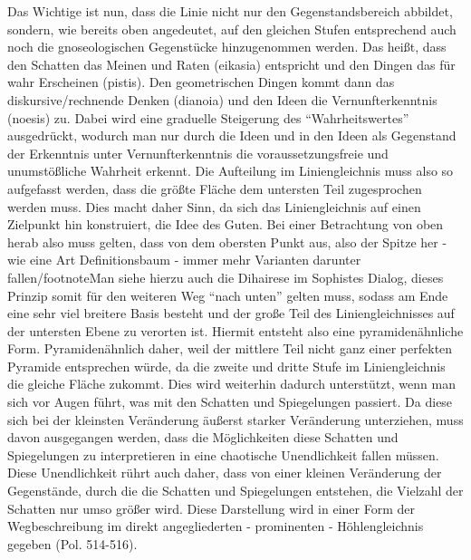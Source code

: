 Das Wichtige ist nun, dass die Linie nicht nur den Gegenstandsbereich abbildet, sondern, wie bereits oben angedeutet, auf den gleichen Stufen entsprechend auch noch die gnoseologischen Gegenstücke hinzugenommen werden. Das heißt, dass den Schatten das Meinen und Raten (eikasia) entspricht und den Dingen das für wahr Erscheinen (pistis). Den geometrischen Dingen kommt dann das diskursive/rechnende Denken (dianoia) und den Ideen die Vernunfterkenntnis (noesis) zu. Dabei wird eine graduelle Steigerung des \enquote{Wahrheitswertes} ausgedrückt, wodurch man nur durch die Ideen und in den Ideen als Gegenstand der Erkenntnis unter Vernunfterkenntnis die voraussetzungsfreie und unumstößliche Wahrheit erkennt. 
Die Aufteilung im Liniengleichnis muss also so aufgefasst werden, dass die größte Fläche dem untersten Teil zugesprochen werden muss. Dies macht daher Sinn, da sich das Liniengleichnis auf einen Zielpunkt hin konstruiert, die Idee des Guten. Bei einer Betrachtung von oben herab also muss gelten, dass von dem obersten Punkt aus, also der Spitze her - wie eine Art Definitionsbaum - immer mehr Varianten darunter fallen/footnote{Man siehe hierzu auch die Dihairese im Sophistes Dialog}, dieses Prinzip somit für den weiteren Weg \enquote{nach unten} gelten muss, sodass am Ende eine sehr viel breitere Basis besteht und der große Teil des Liniengleichnisses auf der untersten Ebene zu verorten ist. Hiermit entsteht also eine pyramidenähnliche Form. Pyramidenähnlich daher, weil der mittlere Teil nicht ganz einer perfekten Pyramide entsprechen würde, da die zweite und dritte Stufe im Liniengleichnis die gleiche Fläche zukommt. Dies wird weiterhin dadurch unterstützt, wenn man sich vor Augen führt, was mit den Schatten und Spiegelungen passiert. Da diese sich bei der kleinsten Veränderung äußerst starker Veränderung unterziehen, muss davon ausgegangen werden, dass die Möglichkeiten diese Schatten und Spiegelungen zu interpretieren in eine chaotische Unendlichkeit fallen müssen. Diese Unendlichkeit rührt auch daher, dass von einer kleinen Veränderung der Gegenstände, durch die die Schatten und Spiegelungen entstehen, die Vielzahl der Schatten nur umso größer wird. Diese Darstellung wird in einer Form der Wegbeschreibung im direkt angegliederten - prominenten - Höhlengleichnis gegeben (Pol. 514-516).\\

